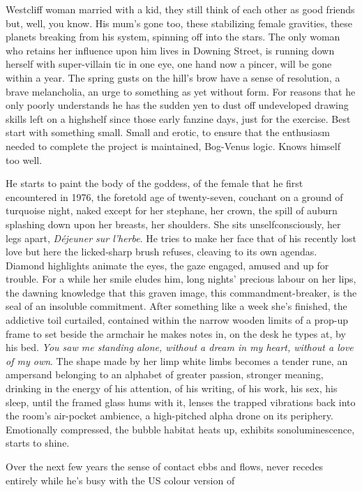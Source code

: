 \documentclass[
]{article}
\begin{document}
Westcliff woman married with a kid, they still think of each other as
good friends but, well, you know. His mum's gone too, these stabilizing
female gravities, these planets breaking from his system, spinning off
into the stars. The only woman who retains her influence upon him lives
in Downing Street, is running down herself with super-villain tic in one
eye, one hand now a pincer, will be gone within a year. The spring gusts
on the hill's brow have a sense of resolution, a brave melancholia, an
urge to something as yet without form. For reasons that he only poorly
understands he has the sudden yen to dust off undeveloped drawing skills
left on a highshelf since those early fanzine days, just for the
exercise. Best start with something small. Small and erotic, to ensure
that the enthusiasm needed to complete the project is maintained,
Bog-Venus logic. Knows himself too well. \par
He starts to paint the body of the goddess, of the female that he
first encountered in 1976, the foretold age of twenty-seven, couchant on
a ground of turquoise night, naked except for her stephane, her crown,
the spill of auburn splashing down upon her breasts, her shoulders. She
sits unselfconsciously, her legs apart, \emph{Déjeuner sur l'herbe}. He
tries to make her face that of his recently lost love but here the
licked-sharp brush refuses, cleaving to its own agendas. Diamond
highlights animate the eyes, the gaze engaged, amused and up for
trouble. For a while her smile eludes him, long nights' precious labour
on her lips, the dawning knowledge that this graven image, this
commandment-breaker, is the seal of an insoluble commitment. After
something like a week she's finished, the addictive toil curtailed,
contained within the narrow wooden limits of a prop-up frame to set
beside the armchair he makes notes in, on the desk he types at, by his
bed. \emph{You saw me standing alone, without a dream in my heart,
without a love of my own}. The shape made by her limp white limbs
becomes a tender rune, an ampersand belonging to an alphabet of greater
passion, stronger meaning, drinking in the energy of his attention, of
his writing, of his work, his sex, his sleep, until the framed glass
hums with it, lenses the trapped vibrations back into the room's
air-pocket ambience, a high-pitched alpha drone on its periphery.
Emotionally compressed, the bubble habitat heats up, exhibits
sonoluminescence, starts to shine. \par
Over the next few years the sense of contact ebbs and flows, never
recedes entirely while he's busy with the US colour version of
\end{document}
